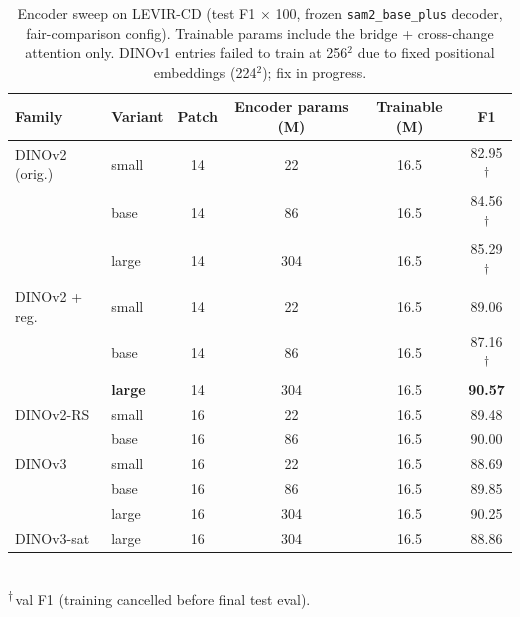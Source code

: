 \begin{table}[t]
  \centering
  \small
  \caption{Encoder sweep on LEVIR-CD (test F1 $\times$ 100, frozen
    \texttt{sam2\_base\_plus} decoder, fair-comparison config).
    Trainable params include the bridge + cross-change attention only.
    DINOv1 entries failed to train at 256$^2$ due to fixed positional
    embeddings (224$^2$); fix in progress.}
  \label{tab:enc-sweep}
  \begin{tabular}{llcccc}
    \toprule
    Family & Variant & Patch & Encoder params (M) & Trainable (M) & F1 \\
    \midrule
    DINOv2 (orig.)   & small         & 14 & 22  & 16.5 & 82.95\textsuperscript{$\dagger$} \\
                     & base          & 14 & 86  & 16.5 & 84.56\textsuperscript{$\dagger$} \\
                     & large         & 14 & 304 & 16.5 & 85.29\textsuperscript{$\dagger$} \\
    DINOv2 + reg.    & small         & 14 & 22  & 16.5 & 89.06 \\
                     & base          & 14 & 86  & 16.5 & 87.16\textsuperscript{$\dagger$} \\
                     & \textbf{large}& 14 & 304 & 16.5 & \textbf{90.57} \\
    DINOv2-RS        & small         & 16 & 22  & 16.5 & 89.48 \\
                     & base          & 16 & 86  & 16.5 & 90.00 \\
    DINOv3           & small         & 16 & 22  & 16.5 & 88.69 \\
                     & base          & 16 & 86  & 16.5 & 89.85 \\
                     & large         & 16 & 304 & 16.5 & 90.25 \\
    DINOv3-sat       & large         & 16 & 304 & 16.5 & 88.86 \\
    \bottomrule
  \end{tabular}\\[2pt]
  {\footnotesize
  \textsuperscript{$\dagger$}\,val F1 (training cancelled before final test eval).
  }
\end{table}

